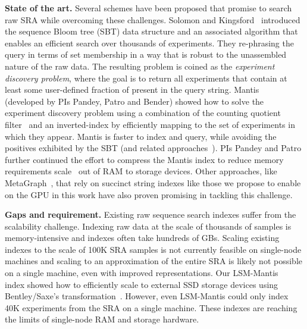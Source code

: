 \noindent
\textbf{State of the art.}
Several schemes have been proposed that promise to search raw SRA while overcoming these challenges. Solomon and Kingsford~\cite{solomon2016fast} introduced the sequence Bloom tree (SBT) data structure and an associated algorithm that enables an efficient search over thousands of experiments. They re-phrasing the query in terms of \kmer set membership in a way that is robust to the unassembled nature of the raw data. The resulting problem is coined as the \emph{experiment discovery problem}, where the goal is to return all experiments that contain at least some user-defined fraction of \kmers present in the query string.
%
Mantis~\cite{PandeyAlBe18} (developed by PIs Pandey, Patro and Bender) showed how to solve the experiment discovery problem using a combination of the counting quotient filter~\cite{PandeyBJP17} and an inverted-index by efficiently mapping \kmers to the set of experiments in which they appear. Mantis is faster to index and query, while avoiding the positives exhibited by the SBT (and related approaches~\cite{SolomonK17,HarrisM20,BingmannBGI19}). 
%
PIs Pandey and Patro further continued the effort to compress the Mantis index to reduce memory requirements scale~\cite{AlmodaresiPFJP19,AlmodaresiPFJP20} out of RAM to storage devices. Other approaches, like MetaGraph~\cite{Karasikov2020}, that rely on succinct string indexes like those we propose to enable on the GPU in this work have also proven promising in tackling this challenge.

\noindent
\textbf{Gaps and requirement.}
Existing raw sequence search indexes suffer from the scalability challenge. Indexing raw data at the scale of thousands of samples is memory-intensive and indexes often take hundreds of GBs. 
Scaling existing indexes to the scale of 100K SRA samples is not currently feasible on single-node machines and scaling to an approximation of the entire SRA is likely not possible on a single machine, even with improved representations. Our LSM-Mantis~\cite{almodaresi2022incrementally} index showed how to efficiently scale to external SSD storage devices using Bentley/Saxe's transformation~\cite{BentleyS80}. However, even LSM-Mantis could only index 40K experiments from the SRA on a single machine. These indexes are reaching the limits of single-node RAM and storage hardware.



